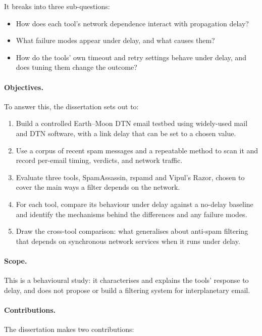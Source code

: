It breaks into three sub-questions:

\begin{itemize}
  \item How does each tool's network dependence interact with propagation delay?
  \item What failure modes appear under delay, and what causes them?
  \item How do the tools' own timeout and retry settings behave under delay, and
  does tuning them change the outcome?
\end{itemize}

\paragraph{Objectives.}
To answer this, the dissertation sets out to:

\begin{enumerate}
  \item Build a controlled Earth--Moon DTN email testbed using widely-used mail and DTN
  software, with a link delay that can be set to a chosen value.
  \item Use a corpus of recent spam messages and a repeatable method to scan it and record per-email timing, verdicts, and network traffic.
  \item Evaluate three tools, SpamAssassin, rspamd and Vipul's Razor, chosen to
  cover the main ways a filter depends on the network.
  \item For each tool, compare its behaviour under delay against a no-delay baseline
  and identify the mechanisms behind the differences and any failure modes.
  \item Draw the cross-tool comparison: what generalises about anti-spam filtering
  that depends on synchronous network services when it runs under delay.
\end{enumerate}

\paragraph{Scope.}
This is a behavioural study: it characterises and explains the tools' response to
delay, and does not propose or build a filtering system for interplanetary email.

\paragraph{Contributions.}
The dissertation makes two contributions:

